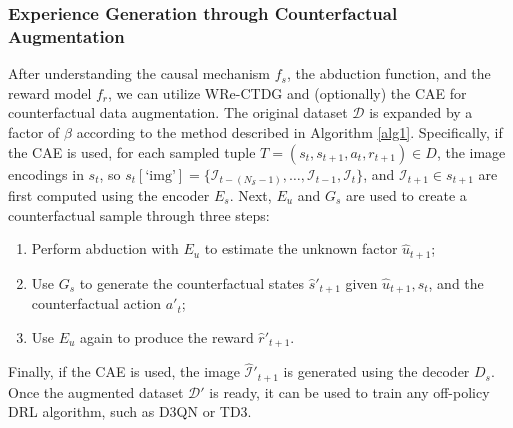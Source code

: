 \subsubsection{Experience Generation through Counterfactual Augmentation}

After understanding the causal mechanism \( f_s \),
the abduction function, and the reward model \( f_r \),
we can utilize WRe-CTDG and (optionally) the CAE
for counterfactual
data augmentation. The original dataset \( \mathcal{D} \)
is expanded by a factor of \( \beta \)
according to the method described in Algorithm \ref{alg1}.
Specifically, if the CAE is used, for each sampled tuple
\( T = (s_t, s_{t+1}, a_t, r_{t+1}) \in D \),
the image encodings in $s_t$, so
\( s_t[\text{`img'}] = \{\mathcal{I}_{t-(N_{\mathcal{S}}-1)}, \ldots, \mathcal{I}_{t-1}, \mathcal{I}_t\} \),
and \( \mathcal{I}_{t+1} \in s_{t+1} \) are first computed using
the encoder \( E_s \). Next, \( E_u \) and \( G_s \)
are used to create a counterfactual
sample through three steps:
\begin{enumerate}
    \item Perform abduction with \( E_u \) to estimate
    the unknown factor \( \hat{u}_{t+1} \);
    \item Use \( G_s \) to generate the counterfactual
    states \( \hat{s}'_{t+1} \) given
    \( \hat{u}_{t+1}, s_t \), and the counterfactual
    action \( a'_t \);
    \item Use \( E_u \) again to produce the reward
    \( \hat{r}'_{t+1} \).
\end{enumerate}

Finally, if the CAE is used,
the image \( \hat{\mathcal{I}}'_{t+1} \) is generated using
the decoder \( D_s \). Once the augmented dataset
\( \mathcal{D}' \)
is ready, it can be used to train any off-policy DRL
algorithm, such as D3QN or TD3.

